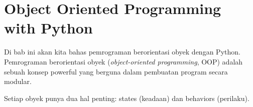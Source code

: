 
\chapter{Object Oriented Programming with Python}

Di bab ini akan kita bahas pemrograman berorientasi obyek dengan Python. Pemrograman berorientasi obyek (\emph{object-oriented programming}, OOP) adalah sebuah konsep powerful yang berguna dalam pembuatan program secara modular.

Setiap obyek punya dua hal penting: states (keadaan) dan behaviors (perilaku).



